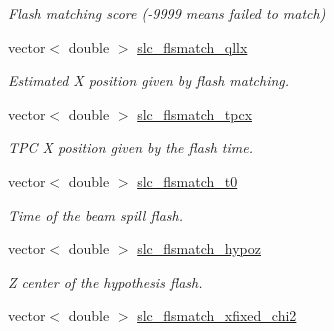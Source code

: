 \begin{DoxyCompactItemize}
\begin{DoxyCompactList}\small\item\em Flash matching score (-\/9999 means failed to match) \end{DoxyCompactList}\item 
\hypertarget{classUBXSecEvent_abc1d1ba9d1ce91ae8784f3e99deb6ebb}{vector$<$ double $>$ \hyperlink{classUBXSecEvent_abc1d1ba9d1ce91ae8784f3e99deb6ebb}{slc\-\_\-flsmatch\-\_\-qllx}}\label{classUBXSecEvent_abc1d1ba9d1ce91ae8784f3e99deb6ebb}

\begin{DoxyCompactList}\small\item\em Estimated X position given by flash matching. \end{DoxyCompactList}\item 
\hypertarget{classUBXSecEvent_afc096cb78a5130678717f9c513e6b90c}{vector$<$ double $>$ \hyperlink{classUBXSecEvent_afc096cb78a5130678717f9c513e6b90c}{slc\-\_\-flsmatch\-\_\-tpcx}}\label{classUBXSecEvent_afc096cb78a5130678717f9c513e6b90c}

\begin{DoxyCompactList}\small\item\em T\-P\-C X position given by the flash time. \end{DoxyCompactList}\item 
\hypertarget{classUBXSecEvent_af4f355424e0a80580b581268eb25dd12}{vector$<$ double $>$ \hyperlink{classUBXSecEvent_af4f355424e0a80580b581268eb25dd12}{slc\-\_\-flsmatch\-\_\-t0}}\label{classUBXSecEvent_af4f355424e0a80580b581268eb25dd12}

\begin{DoxyCompactList}\small\item\em Time of the beam spill flash. \end{DoxyCompactList}\item 
\hypertarget{classUBXSecEvent_a237e3f0d9a59f740ee1725fd7d8186bd}{vector$<$ double $>$ \hyperlink{classUBXSecEvent_a237e3f0d9a59f740ee1725fd7d8186bd}{slc\-\_\-flsmatch\-\_\-hypoz}}\label{classUBXSecEvent_a237e3f0d9a59f740ee1725fd7d8186bd}

\begin{DoxyCompactList}\small\item\em Z center of the hypothesis flash. \end{DoxyCompactList}\item 
\hypertarget{classUBXSecEvent_a51b8f4fca1456ceba66f171ac8e9eb4a}{vector$<$ double $>$ \hyperlink{classUBXSecEvent_a51b8f4fca1456ceba66f171ac8e9eb4a}{slc\-\_\-flsmatch\-\_\-xfixed\-\_\-chi2}}\label{classUBXSecEvent_a51b8f4fca1456ceba66f171ac8e9eb4a}


\end{DoxyCompactItemize}
